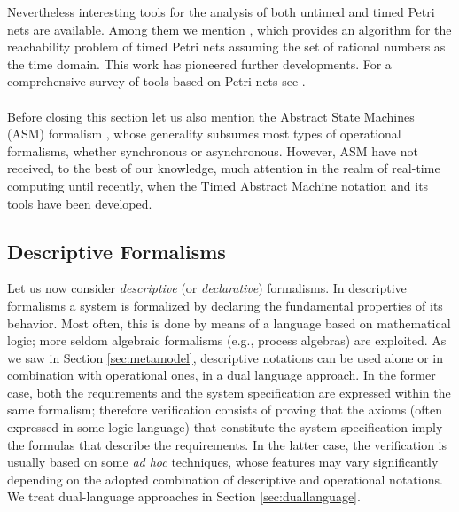 Nevertheless interesting tools for the analysis of both untimed and
timed Petri nets are available. Among them we mention \cite{BD91},
which provides an algorithm for the reachability problem of timed
Petri nets assuming the set of rational numbers as the time
domain. This work has pioneered further developments. For a
comprehensive survey of tools based on Petri nets see \cite{TGI}.



\paragraph{}
Before closing this section let us also mention the Abstract State
Machines (ASM) formalism \cite{BS03}, whose generality subsumes most
types of operational formalisms, whether synchronous or
asynchronous. However, ASM have not received, to the best of our
knowledge, much attention in the realm of real-time computing until
recently, when the Timed Abstract Machine notation \cite{OL07} and
its tools \cite{OL07b} have been developed.






\subsection{Descriptive Formalisms} \label{sec:descriptive} Let us now
consider \emph{descriptive} (or \emph{declarative}) formalisms.  In
descriptive formalisms a system is formalized by declaring the
fundamental properties of its behavior. Most often, this is done by
means of a language based on mathematical logic; more seldom algebraic
formalisms (e.g., process algebras) are exploited. As we saw in
Section \ref{sec:metamodel}, descriptive notations can be used alone
or in combination with operational ones, in a dual language
approach. In the former case, both the requirements and the system
specification are expressed within the same formalism; therefore
verification consists of proving that the axioms (often expressed in
some logic language) that constitute the system specification imply
the formulas that describe the requirements. In the latter case, the
verification is usually based on some \emph{ad hoc} techniques, whose
features may vary significantly depending on the adopted combination
of descriptive and operational notations. We treat dual-language
approaches in Section \ref{sec:duallanguage}.

